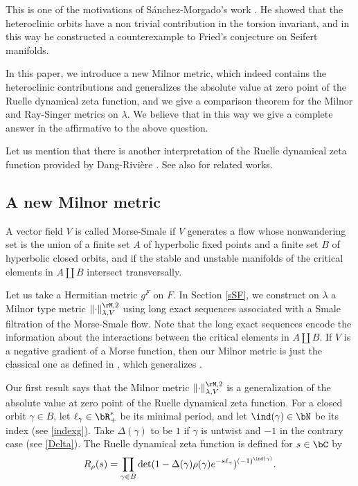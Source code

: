 This is one of the motivations of Sánchez-Morgado's work
\cite{MorgadoMorseSmale}. He showed that the
heteroclinic orbits have a non trivial contribution in the torsion
invariant, and in this way he constructed a counterexample to Fried's
conjecture on Seifert manifolds.

In this
paper, we introduce a new Milnor metric,
which indeed contains the heteroclinic contributions and
generalizes the absolute value at zero point of the Ruelle dynamical zeta function, and we
give a comparison theorem for the Milnor and Ray-Singer metrics on
$\lambda$. We believe
that in this way we give a complete answer in the affirmative to the above question.

Let us mention that there is another interpretation of the Ruelle dynamical zeta
function provided by Dang-Rivière \cite{DR_MSR}. See also
\cite{DR_MSG, DR_MSI, DR_MSII, DR_MSW} for related works.

\subsection{A new Milnor metric}
A vector field $V$ is called Morse-Smale if $V$ generates a flow
whose nonwandering set is the union of a finite set $A$ of
hyperbolic fixed points and a finite set $B$ of hyperbolic closed orbits, and if the stable and unstable manifolds of the critical
elements in $A\coprod B$ intersect transversally.

Let us take a Hermitian metric $g^{F}$ on $F$. In Section
\ref{sSF}, we construct on $\lambda$ a Milnor type metric
$\|{\cdot}\|^{\rM,2}_{\lambda, V}$ using long exact
sequences associated with a Smale
filtration of the Morse-Smale flow. Note that
the long exact
sequences encode the information about the interactions
between the critical elements in $A\coprod B$. If $V$ is a negative gradient of a Morse function,
then our Milnor metric is just the classical one as defined in
\cite[Def.\,1.9]{BZ92}, which generalizes \cite{MilnorWhiteheadTor}.

Our first result says that the Milnor metric
$\|{\cdot}\|^{\rM,2}_{\lambda, V}$ is a generalization of the absolute value at
zero point of
the Ruelle dynamical zeta function. For a closed orbit $\gamma\in B$,
let $\ell_{\gamma}\in \bR^{*}_{+}$ be its minimal period, and let
$\ind(\gamma)\in \bN$ be its index
(see \eqref{indexg}). Take $\Delta(\gamma)$ to be $1$ if
$\gamma$ is untwist and $-1$ in the contrary case (see \eqref{Delta}). The Ruelle dynamical zeta function
is defined for $s\in \bC$ by
\begin{equation*}\label{intoR}
R_{\rho}(s)=\prod_{\gamma\in
B}\det(1-\Delta(\gamma)\rho(\gamma)e^{-s
\ell_\gamma})^{(-1)^{\ind(\gamma)}}.
\end{equation*}


